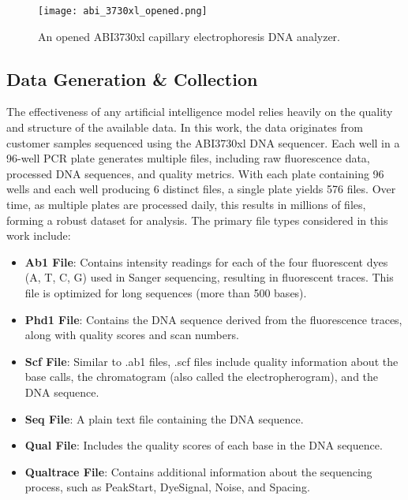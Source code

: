 \begin{figure}[h]
\centering
\texttt{[image: abi\_3730xl\_opened.png]}
\caption{An opened ABI3730xl capillary electrophoresis DNA analyzer.}
\label{fig:abi_3730xl_opened}
\end{figure}

\subsection{Data Generation \& Collection}

The effectiveness of any artificial intelligence model relies heavily on the quality and structure of the available data. In this work, the data originates from customer samples sequenced using the ABI3730xl DNA sequencer. Each well in a 96-well PCR plate generates multiple files, including raw fluorescence data, processed DNA sequences, and quality metrics. With each plate containing 96 wells and each well producing 6 distinct files, a single plate yields 576 files. Over time, as multiple plates are processed daily, this results in millions of files, forming a robust dataset for analysis.
The primary file types considered in this work include:

\begin{itemize}
  \item \textbf{Ab1 File}: Contains intensity readings for each of the four fluorescent dyes (A, T, C, G) used in Sanger sequencing, resulting in fluorescent traces. This file is optimized for long sequences (more than 500 bases).
  \item \textbf{Phd1 File}: Contains the DNA sequence derived from the fluorescence traces, along with quality scores and scan numbers.
  \item \textbf{Scf File}: Similar to .ab1 files, .scf files include quality information about the base calls, the chromatogram (also called the electropherogram), and the DNA sequence.
  \item \textbf{Seq File}: A plain text file containing the DNA sequence.
  \item \textbf{Qual File}: Includes the quality scores of each base in the DNA sequence.
  \item \textbf{Qualtrace File}: Contains additional information about the sequencing process, such as PeakStart, DyeSignal, Noise, and Spacing.
\end{itemize}

